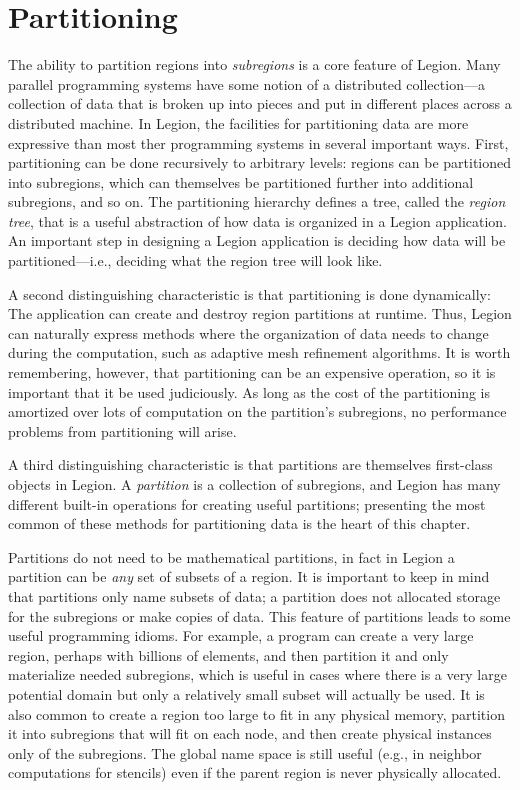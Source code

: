 \chapter{Partitioning}
\label{chap:partitioning}

The ability to partition regions into {\em subregions} is a core
feature of Legion.  Many parallel programming systems have some notion
of a distributed collection---a collection of data that is broken up
into pieces and put in different places across a distributed machine.  In
Legion, the facilities for partitioning data are more expressive than most
ther programming systems in
several important ways.  First, partitioning can be done recursively
to arbitrary levels: regions can be partitioned into subregions, which
can themselves be partitioned further into additional
subregions, and
so on.  The partitioning hierarchy defines a tree, called the {\em
  region tree}, that is a useful abstraction of how data is organized
in a Legion application.  An important step in designing a Legion
application is deciding how data will be partitioned---i.e., deciding
what the region tree will look like.

A second distinguishing characteristic is that partitioning is done dynamically: The application can create and destroy region partitions at runtime.  Thus, Legion can naturally express methods where the organization of data needs to change during the computation, such as adaptive mesh refinement algorithms.  It is worth remembering, however, that partitioning can be an expensive operation, so it is important that it be used judiciously.  As long as the cost of the partitioning is amortized over lots of computation on the partition's subregions, no performance problems from partitioning will arise.

A third distinguishing characteristic is that partitions are themselves first-class objects in Legion.  A {\em partition} is a collection of subregions, and Legion
has many different built-in operations for creating useful partitions; presenting the
most common of these methods for partitioning data is the heart of this chapter.

Partitions do not need to be mathematical partitions, in fact
in Legion a partition can be {\em any} set of subsets of a region.
It is important to keep in mind that partitions only name subsets of data;
a partition does not allocated storage for the subregions or make copies of data.
This feature of partitions leads to some useful programming idioms.  For example, a program
can create a very large region, perhaps with billions of elements, and
then partition it and only materialize needed subregions, which is useful
in cases where there is a very large potential domain but only a relatively
small subset will actually be used.  It is also common to create a region
too large to fit in any physical memory, partition it into subregions that will
fit on each node, and then create physical instances only of the subregions.
The global name space is still useful (e.g., in neighbor computations for stencils)
even if the parent region is never physically allocated.

